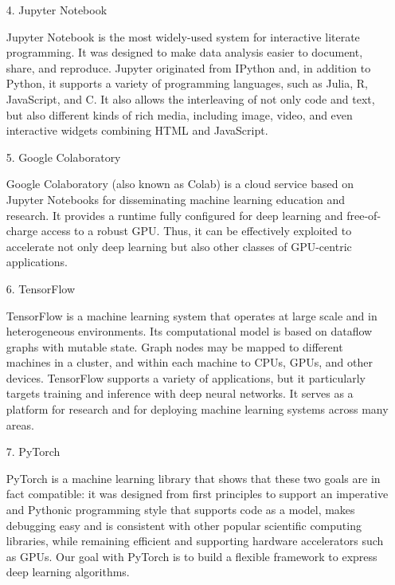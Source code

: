 \documentclass[conference]{IEEEtran}
\begin{document}
\begin{enumerate}
\begin{enumerate}
        \item[4.]Jupyter Notebook \cite{jupyterNotebook}
        \item[]Jupyter Notebook is the most widely-used system for interactive literate programming. It was designed to make data analysis easier to document, share, and reproduce. Jupyter originated from IPython and, in addition to Python, it supports a variety of programming languages, such as Julia, R, JavaScript, and C. It also allows the interleaving of not only code and text, but also different kinds of rich media, including image, video, and even interactive widgets combining HTML and JavaScript.\\

        \item[5.]Google Colaboratory \cite{8485684}
        \item[]Google Colaboratory (also known as Colab) is a cloud service based on Jupyter Notebooks for disseminating machine learning education and research. It provides a runtime fully configured for deep learning and free-of-charge access to a robust GPU. Thus, it can be effectively exploited to accelerate not only deep learning but also other classes of GPU-centric applications.\\

        \item[6.]TensorFlow \cite{Tensorflow}
        \item[]TensorFlow is a machine learning system that operates at large scale and in heterogeneous environments. Its computational model is based on dataflow graphs with mutable state. Graph nodes may be mapped to different machines in a cluster, and within each machine to CPUs, GPUs, and other devices. TensorFlow supports a variety of applications, but it particularly targets training and inference with deep neural networks. It serves as a platform for research and for deploying machine learning systems across many areas. \\

        \item[7.]PyTorch
        \item[]PyTorch is a machine learning library that shows that these two goals are in fact compatible: it was designed from first principles to support an imperative and Pythonic programming style that supports code as a model, makes debugging easy and is consistent with other popular scientific computing libraries, while remaining efficient and supporting hardware accelerators such as GPUs. Our goal with PyTorch is to build a flexible framework to express deep learning algorithms. \\


\end{enumerate}
\end{enumerate}
\end{document}
